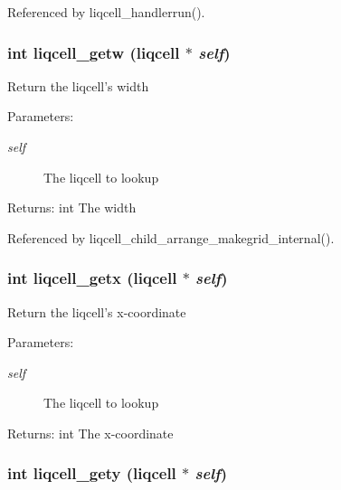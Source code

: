 Referenced by liqcell\_\-handlerrun().
\subsubsection[{liqcell\_\-getw}]{\setlength{\rightskip}{0pt plus 5cm}int liqcell\_\-getw (liqcell $\ast$ {\em self})}\label{d5/da2/liqcell_8c_32fe7856b3f5a305d1bf40779bd9f9b7}


Return the liqcell's width \begin{Desc}
\item[Parameters:]
\begin{description}
\item[{\em self}]The liqcell to lookup \end{description}
\end{Desc}
\begin{Desc}
\item[Returns:]int The width \end{Desc}


Referenced by liqcell\_\-child\_\-arrange\_\-makegrid\_\-internal().
\subsubsection[{liqcell\_\-getx}]{\setlength{\rightskip}{0pt plus 5cm}int liqcell\_\-getx (liqcell $\ast$ {\em self})}\label{d5/da2/liqcell_8c_cee27c164be931dac5c47741aabf2226}


Return the liqcell's x-coordinate \begin{Desc}
\item[Parameters:]
\begin{description}
\item[{\em self}]The liqcell to lookup \end{description}
\end{Desc}
\begin{Desc}
\item[Returns:]int The x-coordinate \end{Desc}
\subsubsection[{liqcell\_\-gety}]{\setlength{\rightskip}{0pt plus 5cm}int liqcell\_\-gety (liqcell $\ast$ {\em self})}\label{d5/da2/liqcell_8c_4a977d16847eeb69393d3ead6e9a6f50}


